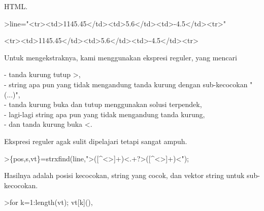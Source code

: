 \documentclass[a4paper,10pt]{article}
\begin{document}
\begin{eulernotebook}
\begin{eulercomment}
\begin{eulercomment}
\begin{eulercomment}
\begin{eulercomment}
\begin{eulercomment}
\begin{eulercomment}
\begin{eulercomment}
\begin{eulercomment}
\begin{eulercomment}
\begin{eulercomment}
\begin{eulercomment}
\begin{eulercomment}
\begin{eulercomment}
\begin{eulercomment}
\begin{eulercomment}
\begin{eulercomment}
\begin{eulercomment}
\begin{eulercomment}
\begin{eulercomment}
\begin{eulercomment}
\begin{eulercomment}
\begin{eulercomment}
\begin{eulercomment}
\begin{eulercomment}
\begin{eulercomment}
\begin{eulercomment}
\begin{eulercomment}
\begin{eulercomment}
\begin{eulercomment}
\begin{eulercomment}
\begin{eulercomment}
\begin{eulercomment}
\begin{eulercomment}
\begin{eulercomment}
\begin{eulercomment}
\begin{eulercomment}
\begin{eulercomment}
\begin{eulercomment}
\begin{eulercomment}
\begin{eulercomment}
\begin{eulercomment}
\begin{eulercomment}
\begin{eulercomment}
\begin{eulercomment}
\begin{eulercomment}
\begin{eulercomment}
\begin{eulercomment}
\begin{eulercomment}
\begin{eulercomment}
\begin{eulercomment}
\begin{eulercomment}
\begin{eulercomment}
\begin{eulercomment}
\begin{eulercomment}
\begin{eulercomment}
\begin{eulercomment}
\begin{eulercomment}
\begin{eulercomment}
\begin{eulercomment}
\begin{eulercomment}
\begin{eulercomment}
\begin{eulercomment}
\begin{eulercomment}
\begin{eulercomment}
\begin{eulercomment}
\begin{eulercomment}
\begin{eulercomment}
\begin{eulercomment}
\begin{eulercomment}
\begin{eulercomment}
\begin{eulercomment}
HTML.
\end{eulercomment}
\begin{eulerprompt}
>line="<tr><td>1145.45</td><td>5.6</td><td>-4.5</td><tr>"
\end{eulerprompt}
\begin{euleroutput}
  <tr><td>1145.45</td><td>5.6</td><td>-4.5</td><tr>
\end{euleroutput}
\begin{eulercomment}
Untuk mengekstraknya, kami menggunakan ekspresi reguler, yang mencari

- tanda kurung tutup \textgreater{},\\
- string apa pun yang tidak mengandung tanda kurung dengan
sub-kecocokan "(...)",\\
- tanda kurung buka dan tutup menggunakan solusi terpendek,\\
- lagi-lagi string apa pun yang tidak mengandung tanda kurung,\\
- dan tanda kurung buka \textless{}.

Ekspresi reguler agak sulit dipelajari tetapi sangat ampuh.
\end{eulercomment}
\begin{eulerprompt}
>\{pos,s,vt\}=strxfind(line,">([^<>]+)<.+?>([^<>]+)<");
\end{eulerprompt}
\begin{eulercomment}
Hasilnya adalah posisi kecocokan, string yang cocok, dan vektor string
untuk sub-kecocokan.
\end{eulercomment}
\begin{eulerprompt}
>for k=1:length(vt); vt[k](), 
\end{eulerprompt}
\end{eulercomment}
\end{eulercomment}
\end{eulercomment}
\end{eulercomment}
\end{eulercomment}
\end{eulercomment}
\end{eulercomment}
\end{eulercomment}
\end{eulercomment}
\end{eulercomment}
\end{eulercomment}
\end{eulercomment}
\end{eulercomment}
\end{eulercomment}
\end{eulercomment}
\end{eulercomment}
\end{eulercomment}
\end{eulercomment}
\end{eulercomment}
\end{eulercomment}
\end{eulercomment}
\end{eulercomment}
\end{eulercomment}
\end{eulercomment}
\end{eulercomment}
\end{eulercomment}
\end{eulercomment}
\end{eulercomment}
\end{eulercomment}
\end{eulercomment}
\end{eulercomment}
\end{eulercomment}
\end{eulercomment}
\end{eulercomment}
\end{eulercomment}
\end{eulercomment}
\end{eulercomment}
\end{eulercomment}
\end{eulercomment}
\end{eulercomment}
\end{eulercomment}
\end{eulercomment}
\end{eulercomment}
\end{eulercomment}
\end{eulercomment}
\end{eulercomment}
\end{eulercomment}
\end{eulercomment}
\end{eulercomment}
\end{eulercomment}
\end{eulercomment}
\end{eulercomment}
\end{eulercomment}
\end{eulercomment}
\end{eulercomment}
\end{eulercomment}
\end{eulercomment}
\end{eulercomment}
\end{eulercomment}
\end{eulercomment}
\end{eulercomment}
\end{eulercomment}
\end{eulercomment}
\end{eulercomment}
\end{eulercomment}
\end{eulercomment}
\end{eulercomment}
\end{eulercomment}
\end{eulercomment}
\end{eulercomment}
\end{eulernotebook}
\end{document}

